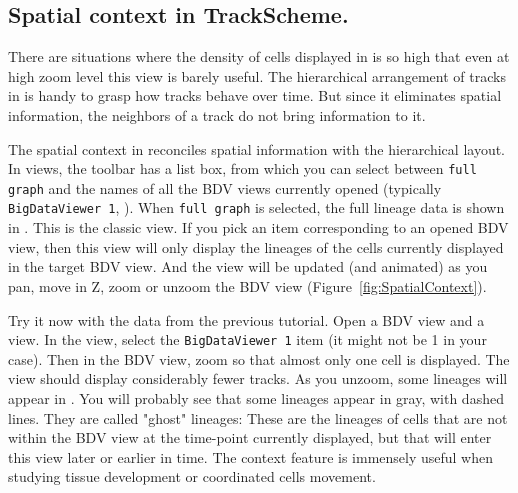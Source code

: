 \subsection{Spatial context in TrackScheme.}
\label{sec:SpatialContext}

There are situations where the density of cells displayed in \TrackScheme is so high that even at high zoom level this view is barely useful. 
The hierarchical arrangement of tracks in \TrackScheme is handy to grasp how tracks behave over time.
But since it eliminates spatial information, the neighbors of a track do not bring information to it.

The spatial context in \TrackScheme reconciles spatial information with the hierarchical layout. 
In \TrackScheme views, the toolbar has a  list box, from which you can select between \texttt{full graph} and the names of all the BDV views currently opened (typically \texttt{BigDataViewer 1}, \etc).
When \texttt{full graph} is selected, the full lineage data is shown in \TrackScheme. 
This is the classic view.
If you pick an item corresponding to an opened BDV view, then this \TrackScheme view will only display the lineages of the cells currently displayed in the target BDV view. 
And the \TrackScheme view will be updated (and animated) as you pan, move in Z, zoom or unzoom the BDV view (Figure~\ref{fig:SpatialContext}). 

Try it now with the data from the previous tutorial.
Open a BDV view and a \TrackScheme view.
In the \TrackScheme view, select the \texttt{BigDataViewer 1} item (it might not be 1 in your case).
Then in the BDV view, zoom so that almost only one cell is displayed. 
The \TrackScheme view should display considerably fewer tracks. 
As you unzoom, some lineages will appear in \TrackScheme.
You will probably see that some lineages appear in gray, with dashed lines.
They are called "ghost" lineages: 
These are the lineages of cells that are not within the BDV view at the time-point currently displayed, but that will enter this view later or earlier in time. 
The context feature is immensely useful when studying tissue development or coordinated cells movement. 



